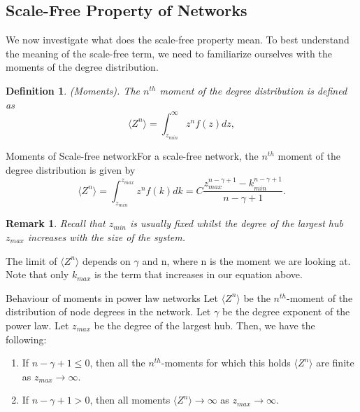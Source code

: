 \documentclass[twoside]{article}
\newtheorem{definition}[theorem]{Definition}
\newtheorem{remark}[theorem]{Remark}
\begin{document}
\subsection{Scale-Free Property of Networks}

We now investigate what does the scale-free property mean. To best understand the meaning of the scale-free term, we need to familiarize ourselves with the moments of the degree distribution.

\begin{definition}(Moments). The $n^{th}$ moment of the degree distribution is defined as 
$$
\langle Z^n \rangle = \int_{z_{min}}^{\infty}z^nf(z)dz,
$$
\end{definition}

\begin{proposition_exam}{Moments of Scale-free network}{}For a scale-free network, the $n^{th}$ moment of the degree distribution is given by 
$$
\langle Z^n \rangle = \int_{z_{min}}^{z_{max}}z^nf(k)dk = C\frac{z_{max}^{n - \gamma + 1} - k_{min}^{n - \gamma + 1}}{n - \gamma + 1}.
$$
\end{proposition_exam}

\begin{remark}Recall that $z_{min}$ is usually fixed whilst the degree of the largest hub $z_{max}$ increases with the size of the system.
\end{remark}

The limit of $\langle Z^n \rangle$ depends on $\gamma$ and n, where n is the moment we are looking at. Note that only $k_{max}$ is the term that increases in our equation above.

\begin{proposition_exam}{Behaviour of moments in power law networks}{} Let $\langle Z^n \rangle$ be the $n^{th}$-moment of the distribution of node degrees in the network. Let $\gamma$ be the degree exponent of the power law. Let $z_{max}$ be the degree of the largest hub. Then, we have the following:
\begin{enumerate}
\item If $n - \gamma + 1 \leq 0$, then all the $n^{th}$-moments for which this holds $\langle Z^n \rangle$ are finite as $z_{max} \rightarrow \infty.$
\item If $n - \gamma + 1 > 0$, then all moments $\langle Z^n \rangle \rightarrow \infty$ as $z_{max} \rightarrow \infty.$ 
\end{enumerate}
\end{proposition_exam}
\end{document}
